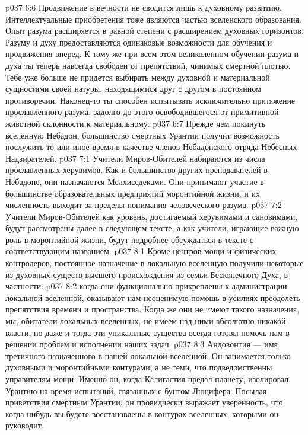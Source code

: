 \vs p037 6:6 Продвижение в вечности не сводится лишь к духовному развитию. Интеллектуальные приобретения тоже являются частью вселенского образования. Опыт разума расширяется в равной степени с расширением духовных горизонтов. Разуму и духу предоставляются одинаковые возможности для обучения и продвижения вперед. К тому же при всем этом великолепном обучении разума и духа ты теперь навсегда свободен от препятствий, чинимых смертной плотью. Тебе уже больше не придется выбирать между духовной и материальной сущностями своей натуры, находящимися друг с другом в постоянном противоречии. Наконец\hyp{}то ты способен испытывать исключительно притяжение прославленного разума, задолго до этого освободившегося от примитивной животной склонности к материальному.
\vs p037 6:7 \pc Прежде чем покинуть вселенную Небадон, большинство смертных Урантии получит возможность послужить то или иное время в качестве членов Небадонского отряда Небесных Надзирателей.
\vs p037 7:1 Учители Миров\hyp{}Обителей набираются из числа прославленных херувимов. Как и большинство других преподавателей в Небадоне, они назначаются Мелхиседеками. Они принимают участие в большинстве образовательных предприятий моронтийной жизни, и их численность выходит за пределы понимания человеческого разума.
\vs p037 7:2 Учители Миров\hyp{}Обителей как уровень, достигаемый херувимами и сановимами, будут рассмотрены далее в следующем тексте, а как учители, играющие важную роль в моронтийной жизни, будут подробнее обсуждаться в тексте с соответствующим названием.
\vs p037 8:1 Кроме центров мощи и физических контролеров, постоянное назначение в локальную вселенную получили некоторые из духовных существ высшего происхождения из семьи Бесконечного Духа, в частности:
\vs p037 8:2 \pc {} когда они функционально прикреплены к администрации локальной вселенной, оказывают нам неоценимую помощь в усилиях преодолеть препятствия времени и пространства. Когда же они не имеют такого назначения, мы, обитатели локальных вселенных, не имеем над ними абсолютно никакой власти, но даже и тогда эти уникальные существа всегда готовы помочь нам в решении проблем и исполнении наших задач.
\vs p037 8:3 Андовонтия --- имя третичного  назначенного в нашей локальной вселенной. Он занимается только духовными и моронтийными контурами, а не теми, что подведомственны управителям мощи. Именно он, когда Калигастия предал планету, изолировал Урантию на время испытаний, связанных с бунтом Люцифера. Посылая приветствия смертным Урантии, он провидчески выражает уверенность, что когда\hyp{}нибудь вы будете восстановлены в контурах вселенных, которыми он руководит.
